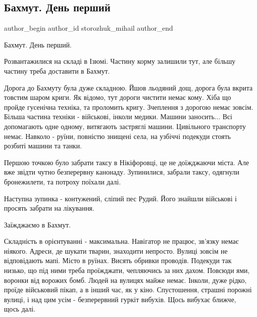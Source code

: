  
 
 
 
 
 
\subsection{Бахмут. День перший}
\label{sec:08_12_2022.fb.storozhuk_mihail.1.bahmut_den_pershyj}
 
\ifcmt
 author_begin
   author_id storozhuk_mihail
 author_end
\fi

Бахмут. День перший.

Розвантажилися на складі в Ізюмі. Частину корму залишили тут, але більшу
частину треба доставити в Бахмут.

Дорога до Бахмуту була дуже складною. Йшов льодяний дощ, дорога була вкрита
товстим шаром криги. Як відомо, тут дороги чистити немає кому. Хіба що пройде
гусенічна техніка, та проломить кригу. Зчеплення з дорогою немає зовсім. Більша
частина техніки - військові, інколи медики. Машини заносить... Всі допомагають
одне одному, витягають застряглі машини.  Цивільного транспорту немає. Навколо
- руїни, повністю знищені села, на узбіччі подекуди стоять розбиті машини та
танки. 

Першою точкою було забрати таксу в Нікіфоровці, це не доїжджаючи міста. Але вже
звідти чутно безперервну канонаду. Зупинилися, забрали таксу, одягнули
бронежилети, та потроху поїхали далі. 

Наступна зупинка - контужений, сліпий пес Рудий. Його знайшли військові і
просять забрати на лікування. 

Заїжджаємо в Бахмут.

Складність в орієнтуванні - максимальна. Навігатор не працює, зв'язку немає
ніякого. Адреси, де шукати тварин, знаходити непросто. Вулиці зовсім не
відповідають мапі.  Місто в руїнах. Висять обривки проводів. Подекуди так
низько, що під ними треба проїжджати, чепляючись за них дахом. Повсюди ями,
воронки від ворожих бомб. Людей на вулицях майже немає. Інколи, дуже рідко,
проїде військовий пікап, а в інший час, як у кіно. Спустошення, страшні порожні
вулиці, і над цим усім - безперервний гуркіт вибухів. Щось вибухає ближче, щось
далі. 

